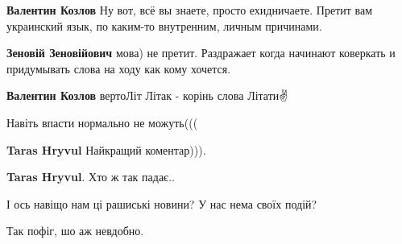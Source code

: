 \begin{itemize}
\begin{itemize}
\begin{itemize}
\textbf{Валентин Козлов} Ну вот, всё вы знаете, просто ехидничаете. Претит вам украинский язык, по каким-то внутренним, личным причинами.

 
\textbf{Зеновій Зеновійович} мова) не претит. Раздражает когда начинают коверкать и придумывать слова на ходу как кому хочется.

 
\textbf{Валентин Козлов} вертоЛіт Літак - корінь слова Літати✌
\end{itemize}

\end{itemize}

 
Навіть впасти нормально не можуть(((

\begin{itemize}
 
\textbf{Taras Hryvul} Найкращий коментар))).

 
\textbf{Taras Hryvul}. Хто ж так падає..
\end{itemize}


І ось навіщо нам ці рашиські новини? У нас нема своїх подій?


Так пофіг, шо аж невдобно.

 

\end{itemize}
